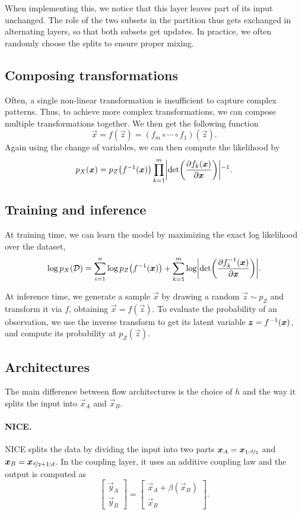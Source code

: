 When implementing this, we notice that this layer leaves part of its input unchanged. The role of
the two subsets in the partition thus gets exchanged in alternating layers, so that both subsets
get updates. In practice, we often randomly choose the splits to ensure proper mixing.

\subsection{Composing transformations}

Often, a single non-linear transformation is insufficient to capture complex patterns. Thus, to
achieve more complex transformations, we can compose multiple transformations together. We then get
the following function \[
    \vec{x} = f(\vec{z}) = (f_m \circ \cdots \circ f_1)(\vec{z}).
\]
Again using the change of variables, we can then compute the likelihood by \[
    p_X(\vec{x}) = p_Z \lft( \inv{f}(\vec{x}) \rgt) \prod_{k=1}^{m} \inv{\lft| \det{\pdv{f_k(\vec{x})}{\vec{x}}} \rgt|}.
\]

\subsection{Training and inference}

At training time, we can learn the model by maximizing the exact log likelihood over the dataset, \[
    \log p_X(\mathcal{D}) = \sum_{i=1}^n \log p_Z \lft( \inv{f}(\vec{x}) \rgt) + \sum_{k=1}^{m} \log \lft| \det{\pdv{\inv{f_k}(\vec{x})}{\vec{x}}} \rgt|.
\]

At inference time, we generate a sample $\vec{x}$ by drawing a random $\vec{z} \sim p_Z$ and
transform it via $f$, obtaining $\vec{x} = f(\vec{z})$. To evaluate the probability of an
observation, we use the inverse transform to get its latent variable $\vec{z} = \inv{f}(\vec{x})$,
and compute its probability at $p_Z(\vec{z})$.

\subsection{Architectures}

The main difference between flow architectures is the choice of $h$ and the way it splits the input
into $\vec{x}_A$ and $\vec{x}_B$.

\paragraph{NICE.} NICE \citep{dinh2014nice} splits the data by dividing the input into two parts $\vec{x}_A =
    \vec{x}_{1:\nicefrac{d}{2}}$ and $\vec{x}_B = \vec{x}_{\nicefrac{d}{2}+1:d}$. In the coupling
layer, it uses an additive coupling law and the output is computed as \[
    \begin{bmatrix} \vec{y}_A \\ \vec{y}_B \end{bmatrix} = \begin{bmatrix} \vec{x}_A + \beta(\vec{x}_B) \\ \vec{x}_B \end{bmatrix}.
\]

